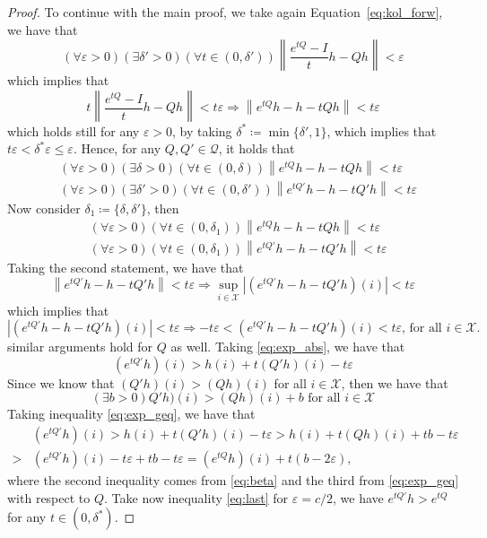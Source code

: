 \documentclass{article}
\newcommand{\statessymbol}{\mathcal{X}}
\newcommand{\matrices}{\mathcal{Q}}
\newcommand{\stateset}{\statessymbol}
\newcommand{\norm}[1]{\left\lVert #1 \right\rVert}
\newcommand{\de}{\delta}
\newcommand{\ve}{\varepsilon}
\begin{document}
\begin{proof}
\noindent
\noindent
To continue with the main proof, we take again Equation~\eqref{eq:kol_forw}, we have that
\begin{equation*}
(\forall\ve>0)(\exists \de'>0)(\forall t \in(0,\de'))\norm{\frac{e^{tQ}-I}{t}h-Qh}<\ve
\end{equation*}
which implies that
\begin{equation*}
t\norm{\frac{e^{tQ}-I}{t}h-Qh}<t\ve\Rightarrow \norm{e^{tQ}h-h-tQh}<t\ve
\end{equation*}
which holds still for any $\ve>0$, by taking $\de^{*}\coloneqq\min\{\de',1\}$, which implies that $t\ve<\de^{*}\ve\leq\ve$.
Hence, for any $Q,Q'\in \matrices$, it holds that
\begin{equation*}
\begin{split}
&(\forall\ve>0)(\exists \de>0)(\forall t \in(0,\de)) \norm{e^{tQ}h-h-tQh}<t\ve\\
&(\forall\ve>0)(\exists \de'>0)(\forall t \in(0,\de')) \norm{e^{tQ'}h-h-tQ'h}<t\ve
\end{split}
\end{equation*}
Now consider $\de_{1}\coloneqq\{\de,\de'\}$, then
\begin{equation*}
\begin{split}
&(\forall\ve>0)(\forall t \in(0,\de_{1})) \norm{e^{tQ}h-h-tQh}<t\ve\\
&(\forall\ve>0)(\forall t \in(0,\de_{1})) \norm{e^{tQ'}h-h-tQ'h}<t\ve
\end{split}
\end{equation*}
Taking the second statement, we have that
\begin{equation*}
\norm{e^{tQ'}h-h-tQ'h}<t\ve \Rightarrow \sup_{i\in\stateset}|(e^{tQ'}h-h-tQ'h)(i)|<t\ve
\end{equation*}
which implies that
\begin{equation} \label{eq:exp_abs}
|(e^{tQ'}h-h-tQ'h)(i)|<t\ve \Rightarrow -t\ve<(e^{tQ'}h-h-tQ'h)(i)<t\ve \text{, for all } i\in\stateset.
\end{equation}
similar arguments hold for $Q$ as well.
Taking \eqref{eq:exp_abs}, we have that
\begin{equation} \label{eq:exp_geq}
(e^{tQ'}h)(i) > h(i)+t(Q'h)(i)-t\ve 
\end{equation}
Since we know that $(Q'h)(i)>(Qh)(i)$ for all $i\in\stateset$, then we have that
\begin{equation} \label{eq:beta}
(\exists b>0) Q'h)(i)>(Qh)(i)+b \text{ for all } i\in\stateset
\end{equation} 
Taking inequality \eqref{eq:exp_geq}, we have that
\begin{equation} \label{eq:last}
\begin{split}
&(e^{tQ'}h)(i) > h(i)+t(Q'h)(i)-t\ve > h(i)+t(Qh)(i)+tb-t\ve \\
>& (e^{tQ'}h)(i)-t\ve+tb-t\ve=(e^{tQ}h)(i)+t(b-2\ve),
\end{split}
\end{equation}
where the second inequality comes from \eqref{eq:beta} and the third from \eqref{eq:exp_geq} with respect to $Q$.
Take now inequality \eqref{eq:last} for $\ve=c/2$, we have $e^{tQ'}h>e^{tQ}$ for any $t\in(0,\de^{*})$.
\end{proof}
\end{document}
